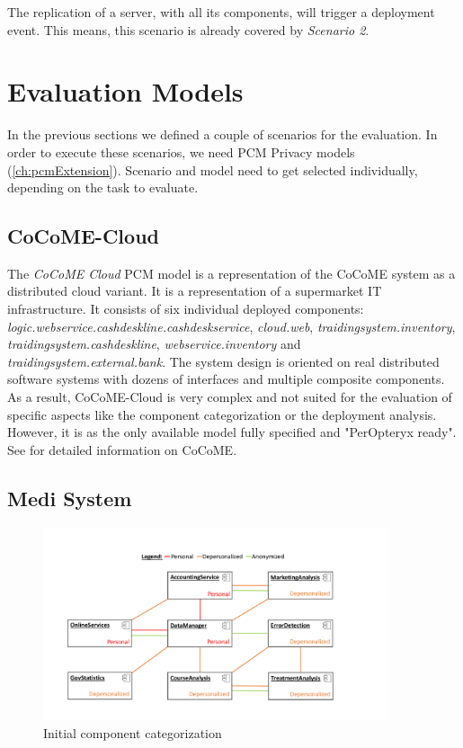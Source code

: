 The replication of a server, with all its components, will trigger a deployment event. This means, this scenario is already covered by \textit{Scenario 2}.


\section{Evaluation Models}
\label{sec:Evaluation:models}

In the previous sections we defined a couple of scenarios for the evaluation. In order to execute these scenarios, we need PCM Privacy models (\autoref{ch:pcmExtension}). Scenario and model need to get selected individually, depending on the task to evaluate.

\subsection{CoCoME-Cloud}
\label{sec:eval:models:cocome}

The \textit{CoCoME Cloud} PCM model is a representation of the CoCoME system as a distributed cloud variant. It is a representation of a supermarket IT infrastructure. It consists of six individual deployed components:  \textit{logic.webservice.cashdeskline.cashdeskservice}, \textit{cloud.web}, \textit{traidingsystem.inventory}, \textit{traidingsystem.cashdeskline}, \textit{webservice.inventory} and \textit{traidingsystem.external.bank}. The system design is oriented on real distributed software systems with dozens of interfaces and multiple composite components. As a result, CoCoME-Cloud is very complex and not suited for the evaluation of specific aspects like the component categorization or the deployment analysis. However, it is as the only available model fully specified and "PerOpteryx ready". See \cite{Heinrich.2015} for detailed information on CoCoME.


\subsection{Medi System}
\label{sec:eval:models:medSys}

\begin{figure}[h]
	\centering
	\includegraphics[trim = 0mm 10mm 0mm 20mm, clip, width=0.90\textwidth]{graphs/medSystem_noserver}
	\caption{Initial component categorization}
	\label{fig:model:medi}
\end{figure}

